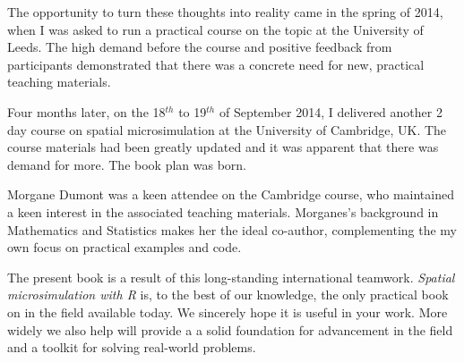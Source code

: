 The opportunity to turn these thoughts into reality came in the spring
of 2014, when I was asked to run a practical course on the topic at
the University of Leeds.
The high demand before the course
and positive feedback from participants
demonstrated that there was a concrete need for new, practical teaching materials.

Four months later, on the 18$^{th}$ to 19$^{th}$ of September 2014,
I delivered another 2 day course on spatial microsimulation
at the University of Cambridge, UK.
The course materials had been greatly updated
and it was apparent that there was demand for more.
The book plan was born.

Morgane Dumont was a keen attendee on the Cambridge course, who
maintained a keen interest in the associated teaching materials.
Morganes's background in Mathematics and Statistics makes her the
ideal co-author, complementing the my own focus on practical examples
and code.



The present book is a
result of this long-standing international teamwork.
\emph{Spatial microsimulation with R} is,
to the best of our knowledge, the only practical book on in the
field available today.
We sincerely hope it is useful in your work.
More widely we also help will provide a
a solid foundation for advancement in the
field and a toolkit for solving real-world problems.

